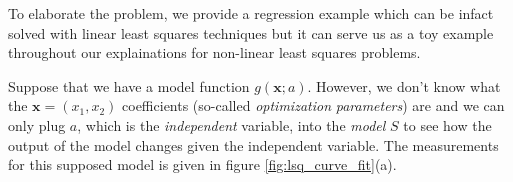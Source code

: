 \documentclass[a4paper]{report}
\numberwithin{figure}{section}
\newcommand{\R}{\mathbb{R}}
\begin{document}





To elaborate the problem, we provide a regression example 
which can be infact solved with linear least squares techniques but 
it can serve us 
as a toy example throughout our explainations for non-linear least squares 
problems.


Suppose that we have a model function $g(\mathbf{x};a)$. However,
we don't know what the $\mathbf{x}=(x_1,x_2)$ coefficients (so-called
\textit{optimization} \textit{parameters}) are and we can only
plug $a$, which is the \textit{independent} variable, into the
\textit{model} $S$ to see
how the output of the model changes given the independent variable. 
The measurements for this supposed model is given in figure 
\ref{fig:lsq_curve_fit}(a).

%
\end{document}
